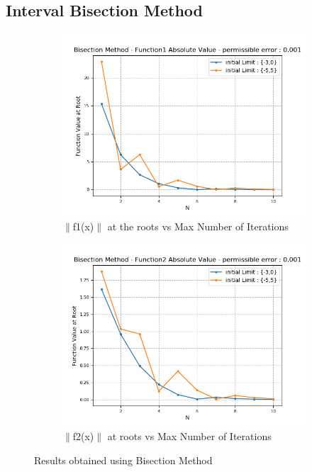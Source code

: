 \documentclass[11pt]{article}
\begin{document}
\subsection{Interval Bisection Method}
\begin{figure} [h!]
	\centering
	\begin{subfigure}{0.55\textwidth}
		\centering
		\includegraphics[width=\linewidth]{bsm-f1-abs}
		\caption{$\|$f1(x)$\|$ at the roots vs Max Number of Iterations}
		\label{fig1:sub1}
	\end{subfigure}%
	\begin{subfigure}{0.55\textwidth}
		\centering
		\includegraphics[width=\linewidth]{bsm-f2-abs}
		\caption{$\|$f2(x)$\|$ at roots vs Max Number of Iterations}
		\label{fig1:sub2}
	\end{subfigure}
	\caption{Results obtained using Bisection Method}
\end{figure}
\end{document}
